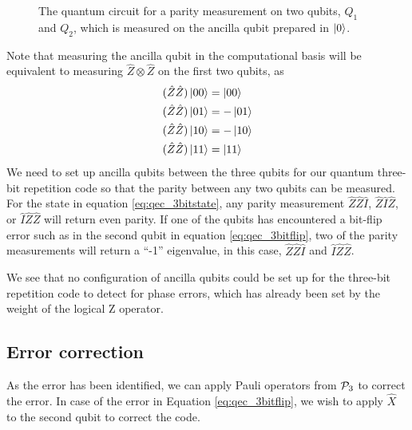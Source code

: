 \begin{figure}[htbp]
  \centering
  \caption{The quantum circuit for a parity measurement on two qubits, $Q_1$ and $Q_2$, which is measured on the ancilla qubit prepared in $\ket{0}$.}\label{fig:2qubitparity}
\end{figure}

Note that measuring the ancilla qubit in the computational basis will be equivalent to measuring $\hat{Z}\otimes \hat{Z}$ on the first two qubits, as
\begin{align*}
    (\hat{Z}\hat{Z})\ket{00} &= \ket{00} \\
    (\hat{Z}\hat{Z})\ket{01} &= -\ket{01} \\
    (\hat{Z}\hat{Z})\ket{10} &= -\ket{10} \\
    (\hat{Z}\hat{Z})\ket{11} &= \ket{11} 
\end{align*}
We need to set up ancilla qubits between the three qubits for our quantum three-bit repetition code so that the parity between any two qubits can be measured. For the state in equation \eqref{eq:qec_3bitstate}, any parity measurement $\hat{Z}\hat{Z}\hat{I}$, $\hat{Z}\hat{I}\hat{Z}$, or $\hat{I}\hat{Z}\hat{Z}$ will return even parity. If one of the qubits has encountered a bit-flip error such as in the second qubit in equation \eqref{eq:qec_3bitflip}, two of the parity measurements will return a ``-1'' eigenvalue, in this case, $\hat{Z}\hat{Z}\hat{I}$ and $\hat{I}\hat{Z}\hat{Z}$. 

We see that no configuration of ancilla qubits could be set up for the three-bit repetition code to detect for phase errors, which has already been set by the weight of the logical Z operator.

\subsection{Error correction}

As the error has been identified, we can apply Pauli operators from $\mathcal{P}_3$ to correct the error. In case of the error in Equation \eqref{eq:qec_3bitflip}, we wish to apply $\hat{X}$ to the second qubit to correct the code.

